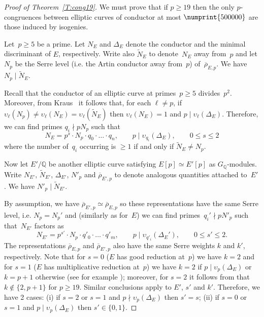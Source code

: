 \documentclass[12pt, reqno]{amsart}
\newcommand{\Q}{\mathbb{Q}}
\newcommand{\rhobar}{{\overline{\rho}}}
\newcommand{\vv}{\upsilon}
\numberwithin{equation}{section}
\newtheorem{theorem}{Theorem}[section]
\theoremstyle{definition}
\theoremstyle{remark}
\begin{document}
\begin{proof}[Proof of Theorem~\ref{T:cong19}]
We must prove that if $p\ge19$ then the only $p$-congruences between
elliptic curves of conductor at most $\numprint{500000}$ are those
induced by isogenies.

Let~$p \geq 5$ be a prime. Let $N_E$ and $\Delta_E$ denote the
conductor and the minimal discriminant of $E$, respectively. Write
also $\tilde{N}_E$ to denote~$N_E$ away from~$p$ and let $N_p$ be the
Serre level (i.e. the Artin conductor away from~$p$)
of~$\rhobar_{E,p}$.  We have $N_p \mid \tilde{N}_E$.

Recall that the conductor of an elliptic curve at primes~$p \geq 5$ divides~$p^2$. Moreover, from Kraus~\cite[p. 30]{KrausThesis}
it follows that, for each $\ell \neq p$, if 
$\vv_{\ell}(N_p) \neq \vv_{\ell}(N_E) = \vv_{\ell}(\tilde{N}_E)$ then
$\vv_{\ell}(N_E) = 1$ and $p \mid \vv_{\ell}(\Delta_E)$.
Therefore, we can find primes $q_i \nmid pN_p$ such that 
\begin{equation}\label{E:condE}
  N_E = p^s \cdot N_p \cdot q_0 \cdot \ldots \cdot q_n, 
 \qquad p \mid \vv_{q_i}(\Delta_E), \qquad 0 \leq s \leq 2
\end{equation}
where the number of~$q_i$ occurring is $\geq 1$ if and only if 
$\tilde{N}_E \neq N_p$. 

Now let $E'/\Q$ be another elliptic curve satisfying $E[p] \simeq E'[p]$ as $G_\Q$-modules. Write $N_{E'}$, $\tilde{N}_{E'}$, $\Delta_{E'}$, $N'_p$ and $\rhobar_{E',p}$ to denote analogous quantities attached to~$E'$. We have $N'_p \mid \tilde{N}_{E'}$.

By assumption, we have $\rhobar_{E',p} \simeq \rhobar_{E,p}$ so these representations have the same Serre level, i.e. $N_p = N_p'$ and (similarly as for~$E$) we can find primes~$q_i' \nmid pN'_p$ such that~$N_{E'}$ factors as
\begin{equation}\label{E:condE'}
 N_{E'} = p^{s'} \cdot N_p \cdot q'_0 \cdot \ldots \cdot q'_m, 
 \qquad p \mid \vv_{q'_i}(\Delta_E'),
 \qquad 0 \leq s' \leq 2.
\end{equation}
The representations $\rhobar_{E,p}$ and $\rhobar_{E',p}$ also have the same Serre weights $k$ and $k'$, respectively. Note that for $s=0$ ($E$ has good reduction at~$p$) we have $k=2$ and for $s=1$ ($E$ has multiplicative reduction at~$p$) we have $k=2$ if $p \mid \vv_p(\Delta_E)$ or $k=p+1$ otherwise (see for example \cite[p. 3]{KrausThesis}); moreover, for $s=2$ it follows from \cite[Th\'eor\`eme 1]{KrausThesis} that $k \not\in \{2, p+1\}$ 
for $p \geq 19$. Similar conclusions apply to $E'$, $s'$ and $k'$. 
Therefore, we have 2 cases: (i) if $s = 2$ or $s=1$ and $p \nmid \vv_{p}(\Delta_E)$ then $s'=s$; (ii) if $s=0$ or $s=1$ and $p \mid \vv_{p}(\Delta_E)$ then $s' \in \{0,1 \}$.


\end{proof}
\end{document}
